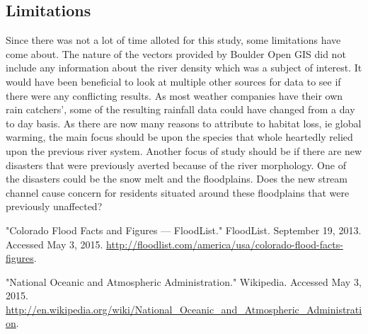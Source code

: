\documentclass[twoside]{article}
\begin{document}
\begin{multicols}{2}
\section{Limitations}

Since there was not a lot of time alloted for this study, some limitations have come about. The nature of the vectors provided by Boulder Open GIS did not include any information about the river density which was a subject of interest. It would have been beneficial to look at multiple other sources for data to see if there were any conflicting results. As most weather companies have their own rain catchers', some of the resulting rainfall data could have changed from a day to day basis.  As there are now many reasons to attribute to habitat loss, ie global warming, the main focus should be upon the species that whole heartedly relied upon the previous river system. Another focus of study should be if there are new disasters that were previously averted because of the river morphology. One of the disasters could be the snow melt and the floodplains. Does the new stream channel cause concern for residents situated around these floodplains that were previously unaffected?




\begin{thebibliography}{100} %

\newblock "Colorado Flood Facts and Figures --- FloodList." FloodList. September 19, 2013. Accessed May 3, 2015. \url{http://floodlist.com/america/usa/colorado-flood-facts-figures}.

\newblock "National Oceanic and Atmospheric Administration." Wikipedia. Accessed May 3, 2015. \url{http://en.wikipedia.org/wiki/National_Oceanic_and_Atmospheric_Administration}.

\end{thebibliography}



\end{multicols}
\end{document}
